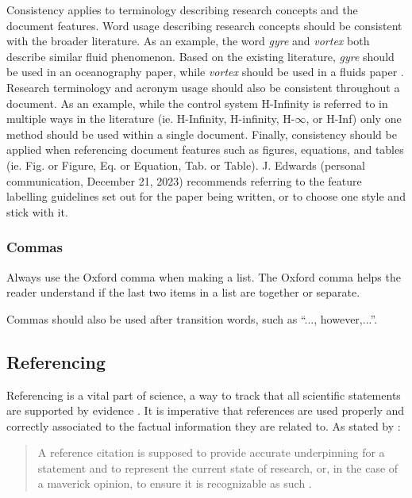 Consistency applies to terminology describing research concepts and the document features. 
Word usage describing research concepts should be consistent with the broader literature. 
As an example, the word \textit{gyre} and \textit{vortex} both describe similar fluid phenomenon. Based on the existing literature, \textit{gyre} should be used in an oceanography paper, while \textit{vortex} should be used in a fluids paper \cite{Vortecies}. 
Research terminology and acronym usage should also be consistent throughout a document. As an example, while the control system H-Infinity is referred to in multiple ways in the literature (ie. H-Infinity, H-infinity, H-$\infty$, or H-Inf) only one method should be used within a single document. 
Finally, consistency should be applied when referencing document features such as figures, equations, and tables (ie. Fig. or Figure, Eq. or Equation, Tab. or Table). 
J. Edwards (personal communication, December 21, 2023) recommends referring to the feature labelling guidelines set out for the paper being written, or to choose one style and stick with it. 

\subsubsection{Commas}

Always use the Oxford comma when making a list. The Oxford comma helps the reader understand if the last two items in a list are together or separate. 

Commas should also be used after transition words, such as ``..., however,...''. 


\subsection{Referencing}

Referencing is a vital part of science, a way to track that all scientific statements are supported by evidence \cite{referncingVirtues}. 
It is imperative that references are used properly and correctly associated to the factual information they are related to. 
As stated by \citeauthor{referncingVirtues} \cite{referncingVirtues}:
\begin{quotation}
	\noindent
	A reference citation is supposed to provide accurate underpinning for a statement and to represent the current state of research, or, in the case of a maverick opinion, to ensure it is recognizable as such \cite{referncingVirtues}.
\end{quotation} 

